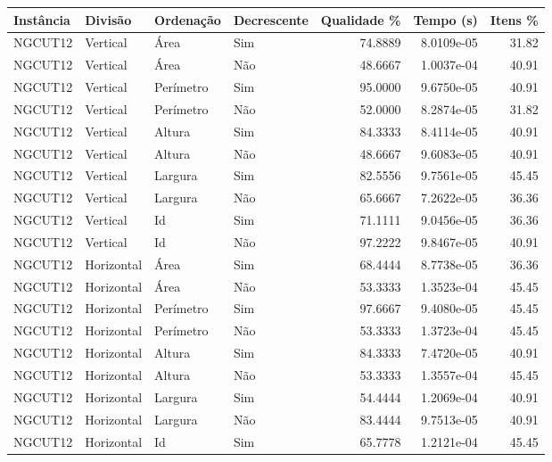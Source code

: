 \begin{tabular}{llllrrr}
\hline
Instância & Divisão     & Ordenação & Decrescente & Qualidade \% & Tempo (s)  & Itens \% \\
\hline
NGCUT12   & Vertical    & Área      & Sim         & 74.8889      & 8.0109e-05 & 31.82    \\
NGCUT12   & Vertical    & Área      & Não         & 48.6667      & 1.0037e-04 & 40.91    \\
NGCUT12   & Vertical    & Perímetro & Sim         & 95.0000      & 9.6750e-05 & 40.91    \\
NGCUT12   & Vertical    & Perímetro & Não         & 52.0000      & 8.2874e-05 & 31.82    \\
NGCUT12   & Vertical    & Altura    & Sim         & 84.3333      & 8.4114e-05 & 40.91    \\
NGCUT12   & Vertical    & Altura    & Não         & 48.6667      & 9.6083e-05 & 40.91    \\
NGCUT12   & Vertical    & Largura   & Sim         & 82.5556      & 9.7561e-05 & 45.45    \\
NGCUT12   & Vertical    & Largura   & Não         & 65.6667      & 7.2622e-05 & 36.36    \\
NGCUT12   & Vertical    & Id        & Sim         & 71.1111      & 9.0456e-05 & 36.36    \\
NGCUT12   & Vertical    & Id        & Não         & 97.2222      & 9.8467e-05 & 40.91    \\
NGCUT12   & Horizontal  & Área      & Sim         & 68.4444      & 8.7738e-05 & 36.36    \\
NGCUT12   & Horizontal  & Área      & Não         & 53.3333      & 1.3523e-04 & 45.45    \\
NGCUT12   & Horizontal  & Perímetro & Sim         & 97.6667      & 9.4080e-05 & 45.45    \\
NGCUT12   & Horizontal  & Perímetro & Não         & 53.3333      & 1.3723e-04 & 45.45    \\
NGCUT12   & Horizontal  & Altura    & Sim         & 84.3333      & 7.4720e-05 & 40.91    \\
NGCUT12   & Horizontal  & Altura    & Não         & 53.3333      & 1.3557e-04 & 45.45    \\
NGCUT12   & Horizontal  & Largura   & Sim         & 54.4444      & 1.2069e-04 & 40.91    \\
NGCUT12   & Horizontal  & Largura   & Não         & 83.4444      & 9.7513e-05 & 40.91    \\
NGCUT12   & Horizontal  & Id        & Sim         & 65.7778      & 1.2121e-04 & 45.45    \\

\end{tabular}
